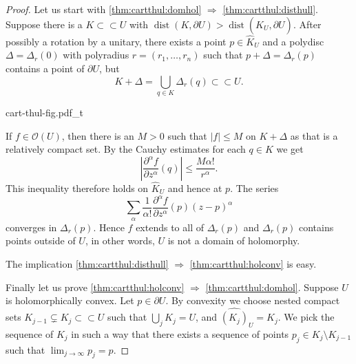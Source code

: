 \documentclass[12pt,openany]{book}
\newcommand{\sabs}[1]{\lvert {#1} \rvert}
\newcommand{\abs}[1]{\left\lvert {#1} \right\rvert}
\newcommand{\sO}{{\mathcal{O}}}
\theoremstyle{plain}
\theoremstyle{remark}
\theoremstyle{definition}
\theoremstyle{exercise}
\theoremstyle{example}
\begin{document}
\begin{proof}
Let us start with \eqref{thm:cartthul:domhol} $\Rightarrow$
\eqref{thm:cartthul:disthull}.  Suppose there is a $K \subset
\subset U$ with $\operatorname{dist}(K,\partial U) > \operatorname{dist}(\widehat{K}_U,\partial U)$.
After possibly a rotation by a unitary,
there exists a point $p \in \widehat{K}_U$ and a polydisc
$\Delta = \Delta_r(0)$ with polyradius $r = (r_1,\ldots,r_n)$ such that
$p + \Delta = \Delta_r(p)$ contains a point of $\partial U$, but
\begin{equation*}
K + \Delta = \bigcup_{q \in K} \Delta_r(q) \subset \subset U.
\end{equation*}

\begin{center}
{cart-thul-fig.pdf_t}
\end{center}

If $f \in \sO(U)$, then there is an $M > 0$ such that $\sabs{f} \leq M$ on
$K + \Delta$ as that is a relatively compact set.  By the Cauchy estimates
for each $q \in K$ we get
\begin{equation*}
\abs{\frac{\partial^\alpha f}{\partial z^\alpha}(q)} \leq \frac{M
\alpha!}{r^\alpha} .
\end{equation*}
This inequality therefore holds on $\widehat{K}_U$ and hence at $p$.
The series
\begin{equation*}
\sum_{\alpha}
\frac{1}{\alpha !}\frac{\partial^\alpha f}{\partial z^\alpha}(p) {(z-p)}^\alpha 
\end{equation*}
converges in $\Delta_r(p)$.  Hence $f$ extends to all of $\Delta_r(p)$ and
$\Delta_r(p)$ contains points outside of $U$, in other words,
$U$ is not a domain of holomorphy.

The implication \eqref{thm:cartthul:disthull} $\Rightarrow$
\eqref{thm:cartthul:holconv} is easy.

Finally let us prove
\eqref{thm:cartthul:holconv} $\Rightarrow$
\eqref{thm:cartthul:domhol}.
Suppose $U$ is holomorphically convex.  Let $p \in \partial U$.
By convexity we choose nested compact sets $K_{j-1} \subsetneq K_j \subset
\subset U$ such that $\bigcup_j K_j = U$, and $\widehat{(K_j)}_U = K_j$.
We pick the sequence of $K_j$ in such a way that 
there exists a 
sequence of points $p_j \in K_j \setminus K_{j-1}$ such that
$\lim_{j\to\infty} p_j = p$.


\end{proof}
\end{document}
